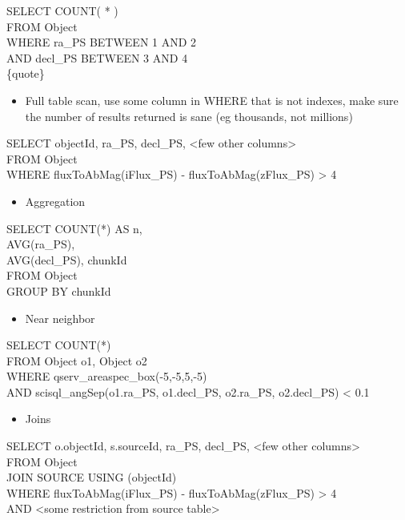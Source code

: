 \documentclass[DM,toc]{lsstdoc}
\begin{document}
SELECT COUNT( * )\\
FROM Object\\
WHERE ra\_PS BETWEEN 1 AND 2\\
AND decl\_PS BETWEEN 3 AND 4\\
\{quote\}

\begin{itemize}
\item
  Full table scan, use some column in WHERE that is not indexes, make
  sure the number of results returned is sane (eg thousands, not
  millions)
\end{itemize}

SELECT objectId, ra\_PS, decl\_PS, \textless{}few other
columns\textgreater{}\\
FROM Object\\
WHERE fluxToAbMag(iFlux\_PS) - fluxToAbMag(zFlux\_PS) \textgreater{} 4

\begin{itemize}
\item
  Aggregation
\end{itemize}

SELECT COUNT(*) AS n,\\
AVG(ra\_PS),\\
AVG(decl\_PS), chunkId\\
FROM Object\\
GROUP BY chunkId

\begin{itemize}
\item
  Near neighbor
\end{itemize}

SELECT COUNT(*)\\
FROM Object o1, Object o2\\
WHERE qserv\_areaspec\_box(-5,-5,5,-5)\\
AND scisql\_angSep(o1.ra\_PS, o1.decl\_PS, o2.ra\_PS, o2.decl\_PS)
\textless{} 0.1

\begin{itemize}
\item
  Joins
\end{itemize}

SELECT o.objectId, s.sourceId, ra\_PS, decl\_PS, \textless{}few other
columns\textgreater{}\\
FROM Object\\
JOIN SOURCE USING (objectId)\\
WHERE fluxToAbMag(iFlux\_PS) - fluxToAbMag(zFlux\_PS) \textgreater{} 4\\
AND \textless{}some restriction from source table\textgreater{}~


\end{document}
